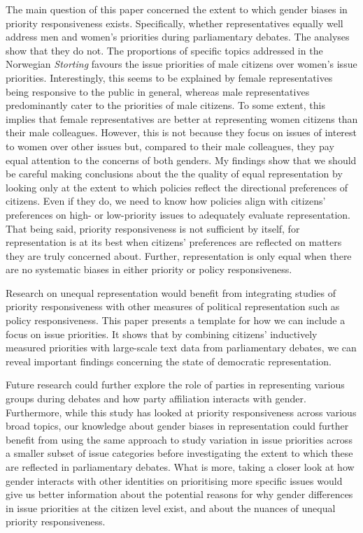 The main question of this paper concerned the extent to which gender biases in priority responsiveness exists. Specifically, whether representatives equally well address men and women's priorities during parliamentary debates. The analyses show that they do not. The proportions of specific topics addressed in the Norwegian \textit{Storting} favours the issue priorities of male citizens over women's issue priorities. Interestingly, this seems to be explained by female representatives being responsive to the public in general, whereas male representatives predominantly cater to the priorities of male citizens. To some extent, this implies that female representatives are better at representing women citizens than their male colleagues. However, this is not because they focus on issues of interest to women over other issues but, compared to their male colleagues, they pay equal attention to the concerns of both genders. 
My findings show that we should be careful making conclusions about the the quality of equal representation by looking only at the extent to which policies reflect the directional preferences of citizens. Even if they do, we need to know how policies align with citizens' preferences on high- or low-priority issues to adequately evaluate representation. That being said, priority responsiveness is not sufficient by itself, for representation is at its best when citizens' preferences are reflected on matters they are truly concerned about. Further, representation is only equal when there are no systematic biases in either priority or policy responsiveness. 

Research on unequal representation would benefit from integrating studies of priority responsiveness with other measures of political representation such as policy responsiveness. This paper presents a template for how we can include a focus on issue priorities. It shows that by combining citizens' inductively measured priorities with large-scale text data from parliamentary debates, we can reveal important findings concerning the state of democratic representation. 

Future research could further explore the role of parties in representing various groups during debates and how party affiliation interacts with gender. Furthermore, while this study has looked at priority responsiveness across various broad topics, our knowledge about gender biases in representation could further benefit from using the same approach to study variation in issue priorities across a smaller subset of issue categories before investigating the extent to which these are reflected in parliamentary debates. What is more, taking a closer look at how gender interacts with other identities on prioritising more specific issues would give us better information about the potential reasons for why gender differences in issue priorities at the citizen level exist, and about the nuances of unequal priority responsiveness. 
